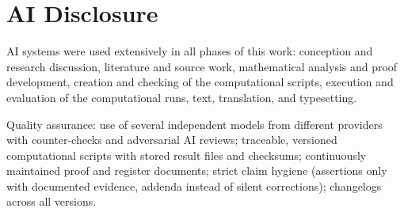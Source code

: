 %
%
%   

\section*{AI Disclosure}

\noindent
AI systems were used extensively in all phases of this work: conception
and research discussion, literature and source work, mathematical analysis
and proof development, creation and checking of the computational scripts,
execution and evaluation of the computational runs, text, translation, and
typesetting.

\medskip

\noindent
Quality assurance: use of several independent models from different
providers with counter-checks and adversarial AI reviews; traceable,
versioned computational scripts with stored result files and checksums;
continuously maintained proof and register documents; strict claim hygiene
(assertions only with documented evidence, addenda instead of silent
corrections); changelogs across all versions.
